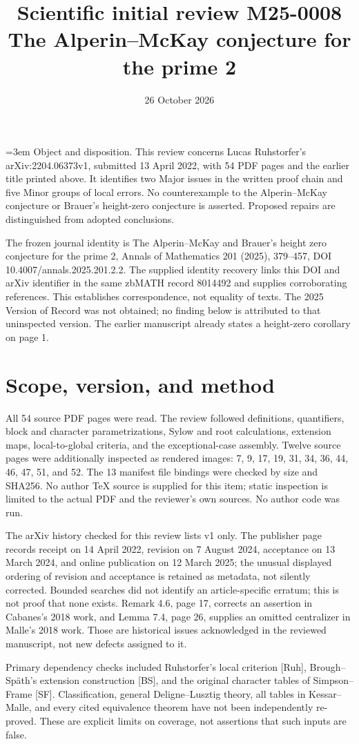 \documentclass[10pt]{article}
\title{Scientific initial review M25-0008
The Alperin–McKay conjecture for the prime 2}
\author{}
\date{26 October 2026}
\begin{document}
\maketitle
=3em Object and disposition. This review concerns Lucas Ruhstorfer’s arXiv:2204.06373v1, submitted 13 April 2022, with 54 PDF pages and the earlier title printed above. It identifies two Major issues in the written proof chain and five Minor groups of local errors. No counterexample to the Alperin–McKay conjecture or Brauer’s height-zero conjecture is asserted. Proposed repairs are distinguished from adopted conclusions.\par
The frozen journal identity is The Alperin–McKay and Brauer’s height zero conjecture for the prime 2, Annals of Mathematics 201 (2025), 379–457, DOI 10.4007/annals.2025.201.2.2. The supplied identity recovery links this DOI and arXiv identifier in the same zbMATH record 8014492 and supplies corroborating references. This establishes correspondence, not equality of texts. The 2025 Version of Record was not obtained; no finding below is attributed to that uninspected version. The earlier manuscript already states a height-zero corollary on page 1.\par
\section*{Scope, version, and method}
All 54 source PDF pages were read. The review followed definitions, quantifiers, block and character parametrizations, Sylow and root calculations, extension maps, local-to-global criteria, and the exceptional-case assembly. Twelve source pages were additionally inspected as rendered images: 7, 9, 17, 19, 31, 34, 36, 44, 46, 47, 51, and 52. The 13 manifest file bindings were checked by size and SHA256. No author TeX source is supplied for this item; static inspection is limited to the actual PDF and the reviewer’s own sources. No author code was run.\par
The arXiv history checked for this review lists v1 only. The publisher page records receipt on 14 April 2022, revision on 7 August 2024, acceptance on 13 March 2024, and online publication on 12 March 2025; the unusual displayed ordering of revision and acceptance is retained as metadata, not silently corrected. Bounded searches did not identify an article-specific erratum; this is not proof that none exists. Remark 4.6, page 17, corrects an assertion in Cabanes’s 2018 work, and Lemma 7.4, page 26, supplies an omitted centralizer in Malle’s 2018 work. Those are historical issues acknowledged in the reviewed manuscript, not new defects assigned to it.\par
Primary dependency checks included Ruhstorfer’s local criterion [Ruh], Brough–Späth’s extension construction [BS], and the original character tables of Simpson–Frame [SF]. Classification, general Deligne–Lusztig theory, all tables in Kessar–Malle, and every cited equivalence theorem have not been independently re-proved. These are explicit limits on coverage, not assertions that such inputs are false.\par
\end{document}
